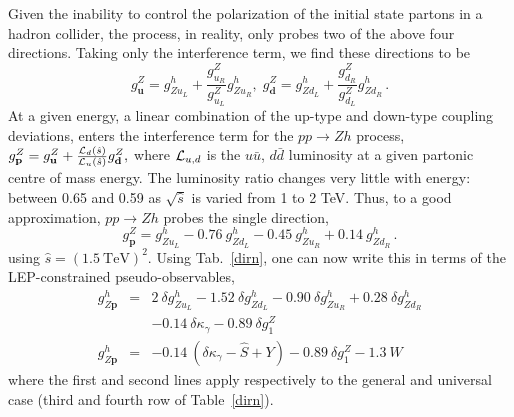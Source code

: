 Given the inability to control the polarization of the initial state partons in a hadron collider, 
the process, in reality, only probes two of the above four directions. Taking only the interference 
term, we find these directions to be
\begin{equation}
g^Z_{\textbf{u}}= g^h_{Zu_L}+\frac{g^Z_{u_R}}{g^Z_{u_L}} g^h_{Zu_R},\; 
g^Z_{\textbf{d}}= g^h_{Zd_L}+\frac{g^Z_{d_R}}{g^Z_{d_L}} g^h_{Zd_R}\,.
\end{equation}
 At a given energy, a linear combination of the up-type and down-type coupling 
 deviations, enters the interference term for the 
 $pp \to Zh$ process, $g^Z_{\textbf{p}}= g^Z_{\textbf{u}}+ \frac{{\cal L}_d(\hat{s})}{{\cal L}_u(\hat{s})}g^Z_{\textbf{d}},$
where ${\cal L}_{u,d}$ is the $u \bar{u}$, $d \bar{d}$ luminosity at a given partonic centre of mass 
energy. The luminosity ratio changes very little with energy: between 0.65 and 0.59 as 
$\sqrt{\hat{s}}$ is varied from 1 to  2 TeV. Thus, to a good approximation, $pp \to Zh$ probes 
the single direction, 
\begin{equation}
g^Z_{\textbf{p}}=g^h_{Zu_L} -0.76~g^h_{Zd_L}   - 0.45~g^h_{Zu_R} + 0.14~g^h_{Zd_R}  \,.
\label{compdir}
\end{equation}
using ${\hat{s}}=(1.5~\text{TeV})^2$. Using Tab.~\ref{dirn}, one can now write this in terms of the LEP-constrained pseudo-observables,
\begin{eqnarray}
g^h_{Z\textbf{p}}&=&2~\delta g^h_{Zu_L} -1.52~\delta g^h_{Zd_L}   - 0.90~\delta g^h_{Zu_R} + 0.28~\delta g^h_{Zd_R}\nonumber\\
&&-0.14~\delta \kappa_\gamma   -0.89~\delta g^Z_1 \nonumber\\
g^h_{Z\textbf{p}}&=&-0.14~(\delta \kappa_\gamma-\hat{S}+Y) -0.89~\delta g^Z_1  -1.3~W
\label{diru}
\end{eqnarray}
where the first  and second lines apply respectively to the general and universal case (third and fourth row of Table~\ref{dirn}). 
 

